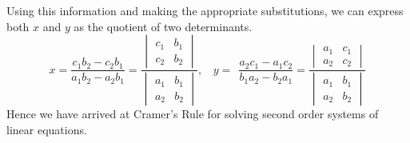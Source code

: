 \documentclass{article}
\begin{document}
\begin{flushleft}
Using this information and making the appropriate substitutions, we can express both $x$ and $y$ as the quotient of two determinants. \[ x = \frac{c_1b_2 - c_2b_1}{a_1b_2 - a_2b_1} = \frac{\begin{vmatrix} c_{1} & b_{1} \\ c_{2} & b_{2}\end{vmatrix}}{\begin{vmatrix} a_{1} & b_{1} \\ a_{2} & b_{2}\end{vmatrix}}, \ \ \ \ y = \ \ \frac{a_2c_1 - a_1c_2}{b_1a_2 - b_2a_1} = \frac{\begin{vmatrix} a_{1} & c_{1} \\ a_{2} & c_{2}\end{vmatrix}}{\begin{vmatrix} a_{1} & b_{1} \\ a_{2} & b_{2}\end{vmatrix}} \]
\linebreak
\linebreak
Hence we have arrived at Cramer's Rule for solving second order systems of linear equations.
\linebreak
\linebreak
{}

\end{flushleft}
\end{document}
